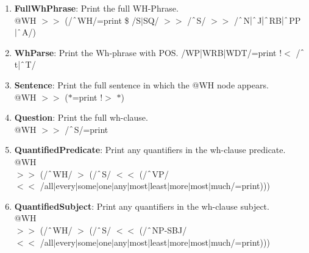 \begin{enumerate}
    \item \textbf{FullWhPhrase}: Print the full WH-Phrase.\\
    @WH $>\!\!>$ (/$\string^$WH/=print \$ /S$|$SQ/ $>\!\!>$ /$\string^$S/ $>\!\!>$ /$\string^$N$|\string^$J$|\string^$RB$|\string^$PP$|\string^$A/)

    \item \textbf{WhParse}: Print the Wh-phrase with POS.
    /WP|WRB|WDT/=print !$<$ /$\string^$t|$\string^$T/

    \item \textbf{Sentence}: Print the full sentence in which the @WH node appears.\\
    @WH $>\!\!>$ ($\ast$=print !$>$ $\ast$)

    \item \textbf{Question}: Print the full wh-clause.\\
    @WH $>\!\!>$ /$\string^$S/=print

    \item \textbf{QuantifiedPredicate}: Print any quantifiers in the wh-clause predicate.\\
    @WH \\
    $>\!\!>$ (/$\string^$WH/ $>$ (/$\string^$S/ $<\!\!<$ (/$\string^$VP/\\
    $<\!\!<$ /all$|$every$|$some$|$one$|$any$|$most$|$least$|$more$|$most$|$much/=print)))

    \item \textbf{QuantifiedSubject}: Print any quantifiers in the wh-clause subject.\\
    @WH \\
    $>\!\!>$ (/$\string^$WH/ $>$ (/$\string^$S/ $<\!\!<$ (/$\string^$NP-SBJ/\\
    $<\!\!<$ /all$|$every$|$some$|$one$|$any$|$most$|$least$|$more$|$most$|$much/=print)))

\end{enumerate}




